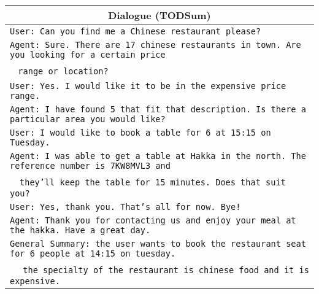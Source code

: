 \documentclass[11pt]{article}
\begin{document}
\begin{table*}[t]
        \centering
        \begin{adjustbox}{width=1.00\textwidth,center}
        \begin{tabular}{ | l |}
        \toprule
        \multicolumn{1}{|c|}{\textbf{Dialogue (TODSum)}} \\ 
        \hline
        \texttt{User: Can you find me a Chinese restaurant please?} \\
        \texttt{Agent: Sure.  There are 17 chinese restaurants in town.  Are you looking for a certain price} \\ 
        \quad\quad\quad~ \texttt{range or location?} \\
        \texttt{User: Yes.  I would like it to be in the expensive price range.} \\
        \texttt{Agent: I have found 5 that fit that description. Is there a particular area you would like?} \\
        \texttt{User: I would like to book a table for 6 at 15:15 on Tuesday.} \\
        \texttt{Agent: I was able to get a table at Hakka in the north. The reference number is 7KW8MVL3 and } \\ \quad\quad\quad~~\texttt{they'll keep the table for 15 minutes. Does that suit you?} \\
        \texttt{User: Yes, thank you. That's all for now. Bye!} \\
        \texttt{Agent: Thank you for contacting us and enjoy your meal at the hakka. Have a great day.} \\
        \hline
        \texttt{General Summary: the user wants to book the restaurant seat for 6 people at 14:15 on tuesday.} \\
        \quad\quad\quad\quad\quad\quad\quad\quad~~ \texttt{the specialty of the restaurant is chinese food and it is expensive. } \\
        

\end{tabular}
\end{adjustbox}
\end{table*}
\end{document}
